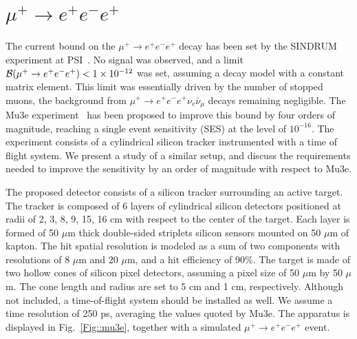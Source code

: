 \section{$\mu^+\to e^+e^-e^+$}
\label{mutoeee}

The current bound on the $\mu^+\to e^+e^-e^+$ decay has been set by the SINDRUM experiment at PSI~\cite{}. No signal was observed, and a limit ${\cal B}(\mu^+\to e^+e^-e^+) < 1\times 10^{-12}$ was set, assuming a decay model with a constant matrix element. This limit was essentially driven by the number of stopped muons, the background from $\mu^+\to e^+e^-e^+ \nu_e \bar\nu_\mu$ decays remaining negligible. 
The Mu3e experiment~\cite{Blondel:2013ia} has been proposed to improve this bound by four orders of magnitude, reaching a single event sensitivity (SES) at the level of $10^{-16}$. The experiment consists of a cylindrical silicon tracker instrumented with a time of flight system. We present a study of a similar setup, and discuss the requirements needed to improve the sensitivity by an order of magnitude with respect to Mu3e.
 
The proposed detector consists of a silicon tracker surrounding an active target. The tracker is composed of 6 layers of cylindrical silicon detectors positioned at radii of 2, 3, 8, 9, 15, 16 cm with respect to the center of the target. Each layer is formed of 50 $\mu$m thick double-sided striplets silicon sensors mounted on 50 $\mu$m of kapton. The hit spatial resolution is modeled as a sum of two components with resolutions of 8 $\mu$m and 20 $\mu$m, and a hit efficiency of 90\%. The target is made of two hollow cones of silicon pixel detectors, assuming a pixel size of 50 $\mu$m by 50 $\mu$m. The cone length and radius are set to 5 cm and 1 cm, respectively. Although not included, a time-of-flight system should be installed as well. We assume a time resolution of 250 ps, averaging the values quoted by Mu3e. The apparatus is displayed in Fig.~\ref{Fig::mu3e}, together with a simulated $\mu^+ \rightarrow e^+e^-e^+$ event.

